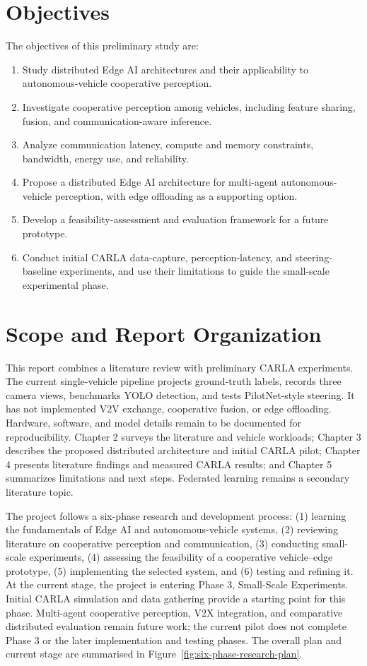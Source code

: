 \documentclass[12pt,a4paper,oneside]{report}
\begin{document}
\section{Objectives}

The objectives of this preliminary study are:
\begin{enumerate}
  \item Study distributed Edge AI architectures and their applicability to
  autonomous-vehicle cooperative perception.
  \item Investigate cooperative perception among vehicles, including
  feature sharing, fusion, and communication-aware inference.
  \item Analyze communication latency, compute and memory constraints,
  bandwidth, energy use, and reliability.
  \item Propose a distributed Edge AI architecture for multi-agent
  autonomous-vehicle perception, with edge offloading as a supporting option.
  \item Develop a feasibility-assessment and evaluation framework for a
  future prototype.
  \item Conduct initial CARLA data-capture, perception-latency, and
  steering-baseline experiments, and use their limitations to guide the
  small-scale experimental phase.
\end{enumerate}

\section{Scope and Report Organization}

This report combines a literature review with preliminary CARLA experiments.
The current single-vehicle pipeline projects ground-truth labels, records
three camera views, benchmarks YOLO detection, and tests PilotNet-style
steering. It has not implemented V2V exchange, cooperative fusion, or edge
offloading. Hardware, software, and model details remain to be documented
for reproducibility. Chapter 2 surveys the literature
and vehicle workloads; Chapter 3 describes the proposed distributed
architecture and initial CARLA pilot; Chapter 4 presents literature
findings and measured CARLA results; and Chapter 5 summarizes limitations
and next steps. Federated learning remains a secondary literature topic.

The project follows a six-phase research and development process: (1)
learning the fundamentals of Edge AI and autonomous-vehicle systems, (2)
reviewing literature on cooperative perception and communication, (3)
conducting small-scale experiments, (4) assessing the
feasibility of a cooperative vehicle--edge prototype, (5) implementing the
selected system, and (6) testing and refining it. At the current stage, the
project is entering Phase 3, Small-Scale Experiments. Initial CARLA
simulation and data gathering provide a starting point for this phase.
Multi-agent cooperative perception, V2X integration, and comparative
distributed evaluation remain future work; the current pilot does not
complete Phase 3 or the later implementation and testing phases. The overall
plan and current stage are summarised in
Figure~\ref{fig:six-phase-research-plan}.
\end{document}
